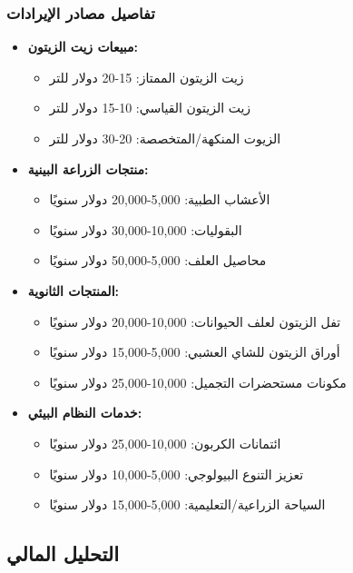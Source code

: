 \subsubsection{تفاصيل مصادر الإيرادات}
\begin{itemize}
    \item \textbf{مبيعات زيت الزيتون:}
    \begin{itemize}
        \item زيت الزيتون الممتاز: 15-20 دولار للتر
        \item زيت الزيتون القياسي: 10-15 دولار للتر
        \item الزيوت المنكهة/المتخصصة: 20-30 دولار للتر
    \end{itemize}
    
    \item \textbf{منتجات الزراعة البينية:}
    \begin{itemize}
        \item الأعشاب الطبية: 5,000-20,000 دولار سنويًا
        \item البقوليات: 10,000-30,000 دولار سنويًا
        \item محاصيل العلف: 5,000-50,000 دولار سنويًا
    \end{itemize}
    
    \item \textbf{المنتجات الثانوية:}
    \begin{itemize}
        \item تفل الزيتون لعلف الحيوانات: 10,000-20,000 دولار سنويًا
        \item أوراق الزيتون للشاي العشبي: 5,000-15,000 دولار سنويًا
        \item مكونات مستحضرات التجميل: 10,000-25,000 دولار سنويًا
    \end{itemize}
    
    \item \textbf{خدمات النظام البيئي:}
    \begin{itemize}
        \item ائتمانات الكربون: 10,000-25,000 دولار سنويًا
        \item تعزيز التنوع البيولوجي: 5,000-10,000 دولار سنويًا
        \item السياحة الزراعية/التعليمية: 5,000-15,000 دولار سنويًا
    \end{itemize}
\end{itemize}

\subsection{التحليل المالي}

